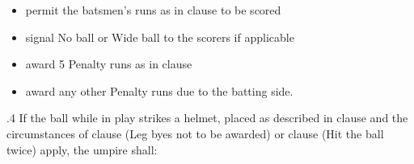 \documentclass[12pt]{article}
\begin{document}
\vspace{\baselineskip}
\begin{itemize}
	\item {\fontsize{9pt}{10.8pt}\selectfont permit the batsmen’s runs as in clause to be scored\par}\par


\vspace{\baselineskip}
	\item {\fontsize{9pt}{10.8pt}\selectfont signal No ball or Wide ball to the scorers if applicable\par}\par


\vspace{\baselineskip}
	\item {\fontsize{9pt}{10.8pt}\selectfont award 5 Penalty runs as in clause \par}\par


\vspace{\baselineskip}
	\item {\fontsize{9pt}{10.8pt}\selectfont award any other Penalty runs due to the batting side.\par}
\end{itemize}\par


\vspace{\baselineskip}
\begin{adjustwidth}{0.5in}{0.32in}
{\fontsize{9pt}{10.8pt}.4 \tabto{0.49in} If the ball while in play strikes a helmet, placed as described in clause and the circumstances of clause (Leg byes not to be awarded) or clause (Hit the ball twice) apply, the umpire shall:\par}\par

\end{adjustwidth}
\end{document}

